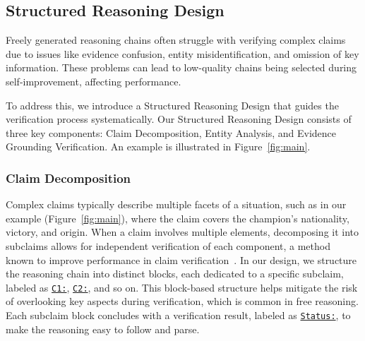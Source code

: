 \subsection{Structured Reasoning Design}\label{sec:structure}
Freely generated reasoning chains often struggle with verifying complex claims due to issues like evidence confusion, entity misidentification, and omission of key information. These problems can lead to low-quality chains being selected during self-improvement, affecting performance.

To address this, we introduce a Structured Reasoning Design that guides the verification process systematically. Our Structured Reasoning Design consists of three key components: Claim Decomposition, Entity Analysis, and Evidence Grounding Verification. An example is illustrated in Figure~\ref{fig:main}.

\subsubsection{Claim Decomposition}
Complex claims typically describe multiple facets of a situation, such as in our example (Figure~\ref{fig:main}), where the claim covers the champion's nationality, victory, and origin. When a claim involves multiple elements, decomposing it into subclaims allows for independent verification of each component, a method known to improve performance in claim verification~\cite{gong2024navigating,min2023factscore}. In our design, we structure the reasoning chain into distinct blocks, each dedicated to a specific subclaim, labeled as \underline{\texttt{C1:}}, \underline{\texttt{C2:}}, and so on. This block-based structure helps mitigate the risk of overlooking key aspects during verification, which is common in free reasoning. Each subclaim block concludes with a verification result, labeled as \underline{\texttt{Status:}}, to make the reasoning easy to follow and parse.
